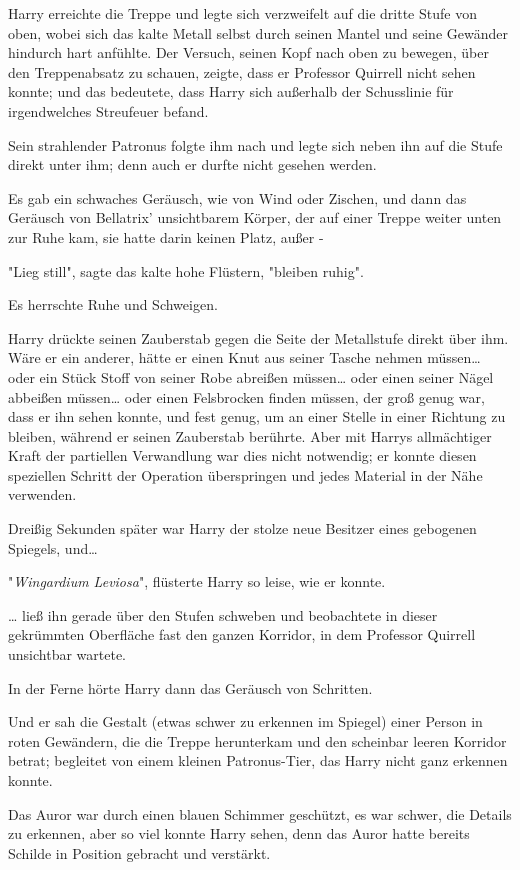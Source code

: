 {Harry erreichte die Treppe und legte sich verzweifelt auf die dritte Stufe von oben, wobei sich das kalte Metall selbst durch seinen Mantel und seine Gewänder hindurch hart anfühlte. Der Versuch, seinen Kopf nach oben zu bewegen, über den Treppenabsatz zu schauen, zeigte, dass er Professor Quirrell nicht sehen konnte; und das bedeutete, dass Harry sich außerhalb der Schusslinie für irgendwelches Streufeuer befand.

Sein strahlender Patronus folgte ihm nach und legte sich neben ihn auf die Stufe direkt unter ihm; denn auch er durfte nicht gesehen werden.

Es gab ein schwaches Geräusch, wie von Wind oder Zischen, und dann das Geräusch von Bellatrix' unsichtbarem Körper, der auf einer Treppe weiter unten zur Ruhe kam, sie hatte darin keinen Platz, außer -

"Lieg still", sagte das kalte hohe Flüstern, "bleiben ruhig".

Es herrschte Ruhe und Schweigen.

Harry drückte seinen Zauberstab gegen die Seite der Metallstufe direkt über ihm. Wäre er ein anderer, hätte er einen Knut aus seiner Tasche nehmen müssen… oder ein Stück Stoff von seiner Robe abreißen müssen… oder einen seiner Nägel abbeißen müssen… oder einen Felsbrocken finden müssen, der groß genug war, dass er ihn sehen konnte, und fest genug, um an einer Stelle in einer Richtung zu bleiben, während er seinen Zauberstab berührte. Aber mit Harrys allmächtiger Kraft der partiellen Verwandlung war dies nicht notwendig; er konnte diesen speziellen Schritt der Operation überspringen und jedes Material in der Nähe verwenden.

Dreißig Sekunden später war Harry der stolze neue Besitzer eines gebogenen Spiegels, und…

"\emph{Wingardium Leviosa}", flüsterte Harry so leise, wie er konnte.

… ließ ihn gerade über den Stufen schweben und beobachtete in dieser gekrümmten Oberfläche fast den ganzen Korridor, in dem Professor Quirrell unsichtbar wartete.

In der Ferne hörte Harry dann das Geräusch von Schritten.

Und er sah die Gestalt (etwas schwer zu erkennen im Spiegel) einer Person in roten Gewändern, die die Treppe herunterkam und den scheinbar leeren Korridor betrat; begleitet von einem kleinen Patronus-Tier, das Harry nicht ganz erkennen konnte.

Das Auror war durch einen blauen Schimmer geschützt, es war schwer, die Details zu erkennen, aber so viel konnte Harry sehen, denn das Auror hatte bereits Schilde in Position gebracht und verstärkt.

}
